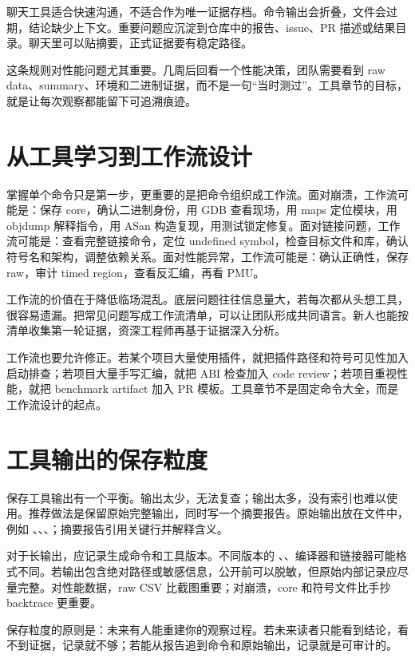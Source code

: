 聊天工具适合快速沟通，不适合作为唯一证据存档。命令输出会折叠，文件会过期，结论缺少上下文。重要问题应沉淀到仓库中的报告、issue、PR 描述或结果目录。聊天里可以贴摘要，正式证据要有稳定路径。

这条规则对性能问题尤其重要。几周后回看一个性能决策，团队需要看到 raw data、summary、环境和二进制证据，而不是一句“当时测过”。工具章节的目标，就是让每次观察都能留下可追溯痕迹。

\section{从工具学习到工作流设计}

掌握单个命令只是第一步，更重要的是把命令组织成工作流。面对崩溃，工作流可能是：保存 core，确认二进制身份，用 GDB 查看现场，用 maps 定位模块，用 objdump 解释指令，用 ASan 构造复现，用测试锁定修复。面对链接问题，工作流可能是：查看完整链接命令，定位 undefined symbol，检查目标文件和库，确认符号名和架构，调整依赖关系。面对性能异常，工作流可能是：确认正确性，保存 raw，审计 timed region，查看反汇编，再看 PMU。

工作流的价值在于降低临场混乱。底层问题往往信息量大，若每次都从头想工具，很容易遗漏。把常见问题写成工作流清单，可以让团队形成共同语言。新人也能按清单收集第一轮证据，资深工程师再基于证据深入分析。

工作流也要允许修正。若某个项目大量使用插件，就把插件路径和符号可见性加入启动排查；若项目大量手写汇编，就把 ABI 检查加入 code review；若项目重视性能，就把 benchmark artifact 加入 PR 模板。工具章节不是固定命令大全，而是工作流设计的起点。

\section{工具输出的保存粒度}

保存工具输出有一个平衡。输出太少，无法复查；输出太多，没有索引也难以使用。推荐做法是保留原始完整输出，同时写一个摘要报告。原始输出放在文件中，例如 、、、；摘要报告引用关键行并解释含义。

对于长输出，应记录生成命令和工具版本。不同版本的 、、编译器和链接器可能格式不同。若输出包含绝对路径或敏感信息，公开前可以脱敏，但原始内部记录应尽量完整。对性能数据，raw CSV 比截图重要；对崩溃，core 和符号文件比手抄 backtrace 更重要。

保存粒度的原则是：未来有人能重建你的观察过程。若未来读者只能看到结论，看不到证据，记录就不够；若能从报告追到命令和原始输出，记录就是可审计的。

